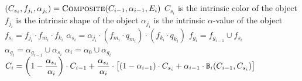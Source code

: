 \algorithm
{}
            \State $(C_{s_i},f_{j_i},\alpha_{j_i})=\hbox{\sc Composite}(C_{i-1},\alpha_{i-1},E_i)$
            \State $C_{s_i}$ is the intrinsic color of the object
            \State $f_{j_i}$ is the intrinsic shape of the object
            \State $\alpha_{j_i}$ is the intrinsic $\alpha$-value of the object
        \EndIf
        \State $f_{s_i}=f_{j_i}\cdot f_{m_i}\cdot f_{k_i}$
        \State $\alpha_{s_i}=\alpha_{j_i}\cdot(f_{m_i}\cdot q_{m_i})\cdot(f_{k_i}\cdot q_{k_i})$
        \State $f_{g_i}=f_{g_{i-1}}\cup f_{s_i}$
        \State $\alpha_{g_i}=\alpha_{g_{i-1}}\cup\alpha_{s_i}$
        \State $\alpha_i=\alpha_0\cup\alpha_{g_i}$
        \State $\displaystyle C_i=\left(1-\frac{\alpha_{s_i}}{\alpha_i}\right)\cdot C_{i-1}
        +\frac{\alpha_{s_i}}{\alpha_i}\cdot\bigl[(1-\alpha_{i-1})\cdot C_{s_i}+\alpha_{i-1}\cdot%
        \B_i(C_{i-1},C_{s_i})\bigr]$
    \EndFor
\EndFunc
\ealgorithm

